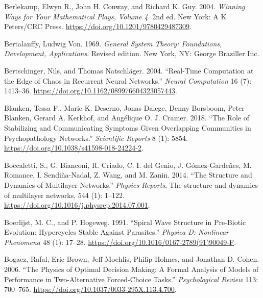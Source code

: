 \documentclass[
  a4paper,
  DIV=11,
  numbers=noendperiod,
  oneside]{scrreprt}
\newlength{\cslhangindent}
\newlength{\cslentryspacingunit} %
\newenvironment{CSLReferences}[2] %
 {%
  \setlength{\parindent}{0pt}
  \ifodd #1
  \let\oldpar\par
  \def\par{\hangindent=\cslhangindent\oldpar}
  \fi
  \setlength{\parskip}{#2\cslentryspacingunit}
 }%
 {}
\begin{document}
\begin{CSLReferences}{1}{0}
\leavevmode{}%
Berlekamp, Elwyn R., John H. Conway, and Richard K. Guy. 2004.
\emph{Winning {Ways} for {Your Mathematical Plays}, {Volume} 4}. 2nd ed.
{New York}: {A K Peters/CRC Press}.
\url{https://doi.org/10.1201/9780429487309}.

\leavevmode{}%
Bertalanffy, Ludwig Von. 1969. \emph{General {System Theory}:
{Foundations}, {Development}, {Applications}}. Revised edition. {New
York, NY}: {George Braziller Inc.}

\leavevmode{}%
Bertschinger, Nils, and Thomas Natschläger. 2004. {``Real-{Time
Computation} at the {Edge} of {Chaos} in {Recurrent Neural Networks}.''}
\emph{Neural Computation} 16 (7): 1413--36.
\url{https://doi.org/10.1162/089976604323057443}.

\leavevmode{}%
Blanken, Tessa F., Marie K. Deserno, Jonas Dalege, Denny Borsboom, Peter
Blanken, Gerard A. Kerkhof, and Angélique O. J. Cramer. 2018. {``The
Role of Stabilizing and Communicating Symptoms Given Overlapping
Communities in Psychopathology Networks.''} \emph{Scientific Reports} 8
(1): 5854. \url{https://doi.org/10.1038/s41598-018-24224-2}.

\leavevmode{}%
Boccaletti, S., G. Bianconi, R. Criado, C. I. del Genio, J.
Gómez-Gardeñes, M. Romance, I. Sendiña-Nadal, Z. Wang, and M. Zanin.
2014. {``The Structure and Dynamics of Multilayer Networks.''}
\emph{Physics Reports}, The structure and dynamics of multilayer
networks, 544 (1): 1--122.
\url{https://doi.org/10.1016/j.physrep.2014.07.001}.

\leavevmode{}%
Boerlijst, M. C., and P. Hogeweg. 1991. {``Spiral Wave Structure in
Pre-Biotic Evolution: {Hypercycles} Stable Against Parasites.''}
\emph{Physica D: Nonlinear Phenomena} 48 (1): 17--28.
\url{https://doi.org/10.1016/0167-2789(91)90049-F}.

\leavevmode{}%
Bogacz, Rafal, Eric Brown, Jeff Moehlis, Philip Holmes, and Jonathan D.
Cohen. 2006. {``The Physics of Optimal Decision Making: {A} Formal
Analysis of Models of Performance in Two-Alternative Forced-Choice
Tasks.''} \emph{Psychological Review} 113: 700--765.
\url{https://doi.org/10.1037/0033-295X.113.4.700}.


\end{CSLReferences}
\end{document}
